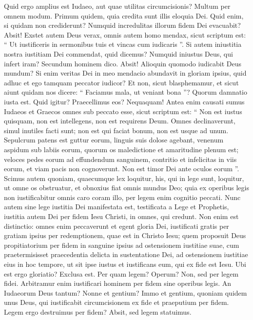 \begin{biblechapter}
\begin{biblechapter}
\begin{biblechapter}
\verse Quid ergo amplius est Iudaeo, aut quae utilitas circumcisionis?
 \verse Multum per omnem modum. Primum quidem, quia credita sunt illis eloquia Dei.
 \verse Quid enim, si quidam non crediderunt? Numquid incredulitas illorum fidem Dei evacuabit?
 \verse Absit! Exstet autem Deus verax, omnis autem homo mendax, sicut scriptum est: “ Ut iustificeris in sermonibus tuis et vincas cum iudicaris ”.
 \verse Si autem iniustitia nostra iustitiam Dei commendat, quid dicemus? Numquid iniustus Deus, qui infert iram? Secundum hominem dico.
 \verse Absit! Alioquin quomodo iudicabit Deus mundum?
 \verse Si enim veritas Dei in meo mendacio abundavit in gloriam ipsius, quid adhuc et ego tamquam peccator iudicor? 
\verse Et non, sicut blasphemamur, et sicut aiunt quidam nos dicere: “ Faciamus mala, ut veniant bona ”? Quorum damnatio iusta est. 
\verse Quid igitur? Praecellimus eos? Nequaquam! Antea enim causati sumus Iudaeos et Graecos omnes sub peccato esse, 
\verse sicut scriptum est:
 “ Non est iustus quisquam,
 \verse non est intellegens, non est requirens Deum.
 \verse Omnes declinaverunt, simul inutiles facti sunt;
 non est qui faciat bonum, non est usque ad unum.
 \verse Sepulcrum patens est guttur eorum,
 linguis suis dolose agebant,
 venenum aspidum sub labiis eorum,
 \verse quorum os maledictione et amaritudine plenum est;
 \verse veloces pedes eorum ad effundendum sanguinem,
 \verse contritio et infelicitas in viis eorum,
 \verse et viam pacis non cognoverunt.
 \verse Non est timor Dei ante oculos eorum ”.
 \verse Scimus autem quoniam, quaecumque lex loquitur, his, qui in lege sunt, loquitur, ut omne os obstruatur, et obnoxius fiat omnis mundus Deo; 
\verse quia ex operibus legis non iustificabitur omnis caro coram illo, per legem enim cognitio peccati.
 \verse Nunc autem sine lege iustitia Dei manifestata est, testificata a Lege et Prophetis, 
\verse iustitia autem Dei per fidem Iesu Christi, in omnes, qui credunt. Non enim est distinctio: 
\verse omnes enim peccaverunt et egent gloria Dei, 
\verse iustificati gratis per gratiam ipsius per redemptionem, quae est in Christo Iesu; 
\verse quem proposuit Deus propitiatorium per fidem in sanguine ipsius ad ostensionem iustitiae suae, cum praetermisisset praecedentia delicta 
 \verse in sustentatione Dei, ad ostensionem iustitiae eius in hoc tempore, ut sit ipse iustus et iustificans eum, qui ex fide est Iesu.
 \verse Ubi est ergo gloriatio? Exclusa est. Per quam legem? Operum? Non, sed per legem fidei. 
\verse Arbitramur enim iustificari hominem per fidem sine operibus legis. 
\verse An Iudaeorum Deus tantum? Nonne et gentium? Immo et gentium, 
 \verse quoniam quidem unus Deus, qui iustificabit circumcisionem ex fide et praeputium per fidem. 
\verse Legem ergo destruimus per fidem? Absit, sed legem statuimus.
 

\end{biblechapter}
\end{biblechapter}
\end{biblechapter}
